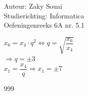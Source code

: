\documentclass[a4paper]{article}
\begin{document}
  
\noindent \large Auteur: Zaky Souai \\
\noindent \large Studierichting:  Informatica\\
\noindent \large Oefeningenreeks 6A nr. 5.1\\

\bigskip

\normalsize


$x_{6} = x_{4} \cdot q^2 \Leftrightarrow q = \sqrt{\dfrac{x_{6}}{x_{4}}}$\\

$\Rightarrow q = \pm 3$\\

$x_{1} = \dfrac{x_{4}}{q} \Rightarrow x_{1} = \pm 7$\\



\begin{thebibliography}{999}
\end{thebibliography}
\end{document}
